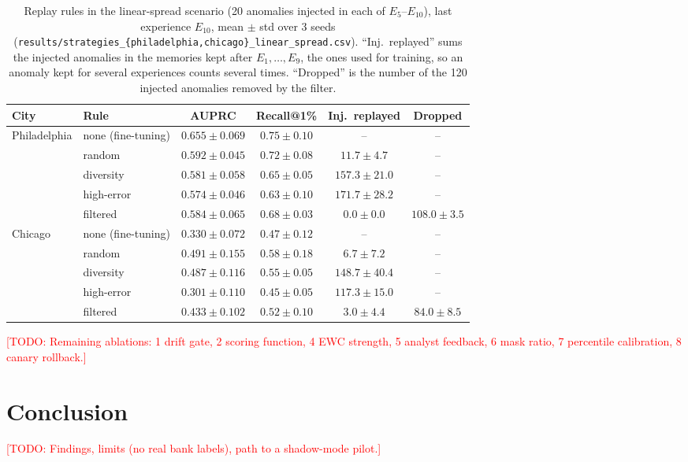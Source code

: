 \documentclass{article} %
\newcommand{\todo}[1]{\textcolor{red}{[TODO: #1]}}
\begin{document}
\begin{table}[t]
\centering\small
\setlength{\tabcolsep}{4pt}
\caption{Replay rules in the linear-spread scenario (20 anomalies injected in
each of $E_5$--$E_{10}$), last experience $E_{10}$, mean $\pm$ std over 3 seeds
(\texttt{results/strategies\_\{philadelphia,chicago\}\_linear\_spread.csv}).
``Inj.\ replayed'' sums the injected anomalies in the memories kept after
$E_1,\dots,E_9$, the ones used for training, so an anomaly kept for several
experiences counts several times. ``Dropped'' is the number of the 120 injected
anomalies removed by the filter.}
\label{tab:abl-filtered}
\begin{tabular}{llcccc}
\toprule
City & Rule & AUPRC & Recall@1\% & Inj.\ replayed & Dropped \\
\midrule
Philadelphia & none (fine-tuning) & $0.655{\pm}0.069$ & $0.75{\pm}0.10$ & -- & -- \\
             & random     & $0.592{\pm}0.045$ & $0.72{\pm}0.08$ & $11.7{\pm}4.7$ & -- \\
             & diversity  & $0.581{\pm}0.058$ & $0.65{\pm}0.05$ & $157.3{\pm}21.0$ & -- \\
             & high-error & $0.574{\pm}0.046$ & $0.63{\pm}0.10$ & $171.7{\pm}28.2$ & -- \\
             & filtered   & $0.584{\pm}0.065$ & $0.68{\pm}0.03$ & $0.0{\pm}0.0$ & $108.0{\pm}3.5$ \\
\midrule
Chicago      & none (fine-tuning) & $0.330{\pm}0.072$ & $0.47{\pm}0.12$ & -- & -- \\
             & random     & $0.491{\pm}0.155$ & $0.58{\pm}0.18$ & $6.7{\pm}7.2$ & -- \\
             & diversity  & $0.487{\pm}0.116$ & $0.55{\pm}0.05$ & $148.7{\pm}40.4$ & -- \\
             & high-error & $0.301{\pm}0.110$ & $0.45{\pm}0.05$ & $117.3{\pm}15.0$ & -- \\
             & filtered   & $0.433{\pm}0.102$ & $0.52{\pm}0.10$ & $3.0{\pm}4.4$ & $84.0{\pm}8.5$ \\
\bottomrule
\end{tabular}
\end{table}

\todo{Remaining ablations: 1 drift gate, 2 scoring function, 4 EWC strength,
5 analyst feedback, 6 mask ratio, 7 percentile calibration, 8 canary rollback.}

\section{Conclusion}\label{sec:conclusion}
\todo{Findings, limits (no real bank labels), path to a shadow-mode pilot.}



\end{document}
